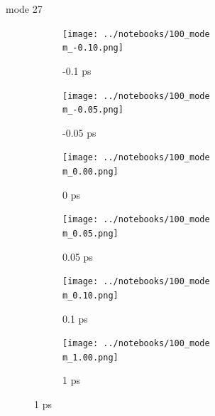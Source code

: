 \documentclass{beamer}
\begin{document}
\renewcommand\m{27}
\begin{frame}{mode \m}
	\begin{figure}
		\centering
		\begin{subfigure}[b]{\w\textwidth}
			\centering
			\texttt{[image: ../notebooks/100\_mode\\m\_-0.10.png]}
			\caption{-0.1 ps}
		\end{subfigure}
		\begin{subfigure}[b]{\w\textwidth}
			\centering
			\texttt{[image: ../notebooks/100\_mode\\m\_-0.05.png]}
			\caption{-0.05 ps}
		\end{subfigure}
		\begin{subfigure}[b]{\w\textwidth}
			\centering
			\texttt{[image: ../notebooks/100\_mode\\m\_0.00.png]}
			\caption{0 ps}
		\end{subfigure}
		\begin{subfigure}[b]{\w\textwidth}
			\centering
			\texttt{[image: ../notebooks/100\_mode\\m\_0.05.png]}
			\caption{0.05 ps}
		\end{subfigure}
		\begin{subfigure}[b]{\w\textwidth}
			\centering
			\texttt{[image: ../notebooks/100\_mode\\m\_0.10.png]}
			\caption{0.1 ps}
		\end{subfigure}
		\begin{subfigure}[b]{\w\textwidth}
			\centering
			\texttt{[image: ../notebooks/100\_mode\\m\_1.00.png]}
			\caption{1 ps}
		\end{subfigure}
	\end{figure}
\end{frame}
\end{document}
